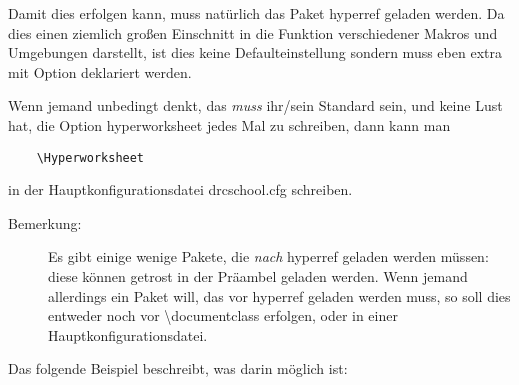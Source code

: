 \documentclass[hyperworksheet]{drcschool}
\newcommand*{\cs}[1]{\textup{\ttfamily\textbackslash#1}}                   %
\newcommand*{\pkg}[1]{\textup{\ttfamily#1}}                                %
\newcommand*{\opt}[1]{\textup{\ttfamily#1}}                                %
\begin{document}
Damit dies erfolgen kann, muss natürlich das Paket \pkg{hyperref} geladen werden.
Da dies einen ziemlich großen Einschnitt in die Funktion verschiedener Makros und Umgebungen
darstellt, ist dies keine Defaulteinstellung sondern muss eben extra mit Option deklariert
werden.

Wenn jemand unbedingt denkt, das \emph{muss} ihr/sein Standard sein, und keine Lust hat,
die Option \opt{hyperworksheet} jedes Mal zu schreiben, dann kann man
\begin{verbatim}
    \Hyperworksheet
\end{verbatim}
in der Hauptkonfigurationsdatei \opt{drcschool.cfg} schreiben.

\begin{description}
\item[Bemerkung:]
Es gibt einige wenige Pakete, die \emph{nach} \pkg{hyperref} geladen werden müssen:
diese können getrost in der Präambel geladen werden. Wenn jemand allerdings ein Paket
will, das vor \pkg{hyperref} geladen werden muss, so soll dies entweder noch vor
\cs{documentclass} erfolgen, oder in einer Hauptkonfigurationsdatei.
\end{description}

Das folgende Beispiel beschreibt, was darin möglich ist:
\end{document}
